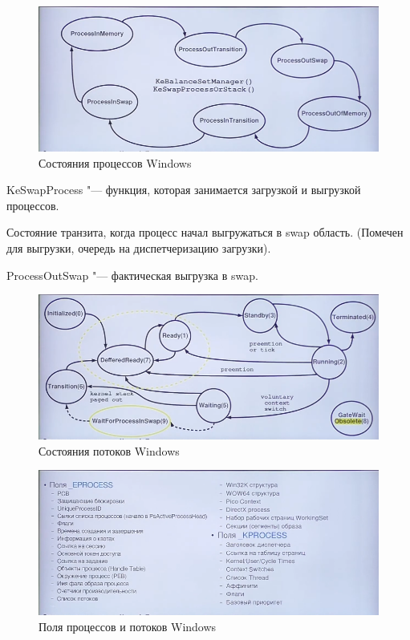 \documentclass[bachelor, och, book]{SCWorks}
\theoremstyle{remark}
\begin{document}
    \begin{figure}[H]
        \begin{center}
            \includegraphics[scale=0.6]{res/state-process-windows.png}
            \caption{Состояния процессов Windows}
        \end{center}
    \end{figure}

    KeSwapProcess "--- функция, которая занимается загрузкой и выгрузкой процессов.

    Состояние транзита, когда процесс начал выгружаться в swap область. (Помечен для выгрузки, очередь на диспетчеризацию загрузки).

    ProcessOutSwap "--- фактическая выгрузка в swap.

    \begin{figure}[H]
        \begin{center}
            \includegraphics[scale=0.6]{res/tread-state-windows.png}
            \caption{Состояния потоков Windows}
        \end{center}
    \end{figure}

    \begin{figure}[H]
        \begin{center}
            \includegraphics[scale=0.6]{res/fields-process-tread-windows.png}
            \caption{Поля процессов и потоков Windows}
        \end{center}
    \end{figure}
\end{document}
